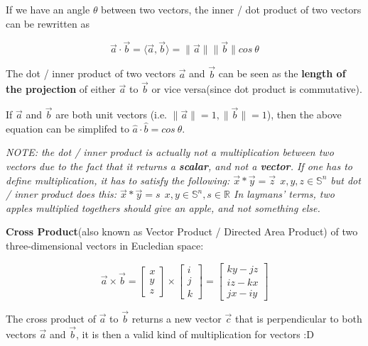 If we have an angle $\theta$ between two vectors, the inner / dot product of two vectors can be rewritten as
\begin{center}
    \[
        {\vec{a}} \cdot {\vec{b}}=\langle \vec{a}, \vec{b} \rangle=\|\vec{a}\|\|\vec{b}\|cos~\theta
    \]
\end{center}

The dot / inner product of two vectors $\vec{a}$ and $\vec{b}$ can be seen as the \textbf{length of the projection} of either $\vec{a}$ to $\vec{b}$ or vice versa(since dot product is commutative).

If $\vec{a}$ and $\vec{b}$ are both unit vectors (i.e. $\|\vec{a}\| = 1, \|\vec{b}\| = 1$), then the above equation
can be simplifed to $\hat{a} \cdot \hat{b}=cos~\theta$.

\vspace{.5em}

\emph{
    NOTE: the dot / inner product is actually not a multiplication between two vectors due to the fact that
    it returns a \textbf{scalar}, and not a \textbf{vector}. If one has to define multiplication, it has to satisfy the following:
    $\vec{x} * \vec{y} = \vec{z} ~~ x,y,z \in \mathbb{S}^n$
    but dot / inner product does this:
    $\vec{x} * \vec{y} = s ~~ x,y \in \mathbb{S}^n, s \in \mathbb{R}$
    In laymans' terms, two apples multiplied togethers should give an apple, and not something else.
}

\sgap
\textbf{Cross Product}(also known as Vector Product / Directed Area Product) of two three-dimensional vectors in Eucledian space:
\begin{center}
    \[
        {\vec{a}} \times {\vec{b}}=\begin{bmatrix}x \\ y \\ z\end{bmatrix} \times \begin{bmatrix}i \\ j \\ k\end{bmatrix}=\begin{bmatrix}ky - jz \\ iz - kx \\ jx - iy\end{bmatrix}
    \]
\end{center}

The cross product of $\vec{a}$ to $\vec{b}$ returns a new vector $\vec{c}$ that is perpendicular to both vectors $\vec{a}$ and $\vec{b}$, it is
then a valid kind of multiplication for vectors :D

